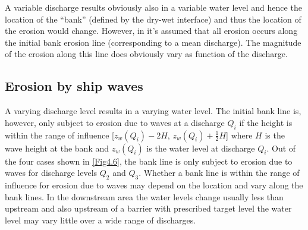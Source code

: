 A variable discharge results obviously also in a variable water level and hence the location of the ``bank'' (defined by the dry-wet interface) and thus the location of the erosion would change.
However, in \dfastbe it's assumed that all erosion occurs along the initial bank erosion line (corresponding to a mean discharge).
The magnitude of the erosion along this line does obviously vary as function of the discharge.

\subsection{Erosion by ship waves}

A varying discharge level results in a varying water level.
The initial bank line is, however, only subject to erosion due to waves at a discharge $Q_i$ if the height is within the range of influence [$z_w(Q_i) - 2 H$, $z_w(Q_i) + \frac{1}{2} H$] where $H$ is the wave height at the bank and $z_w(Q_i)$ is the water level at discharge $Q_i$.
Out of the four cases shown in \autoref{Fig4.6}, the bank line is only subject to erosion due to waves for discharge levels $Q_2$ and $Q_3$.
Whether a bank line is within the range of influence for erosion due to waves may depend on the location and vary along the bank lines.
In the downstream area the water levels change usually less than upstream and also upstream of a barrier with prescribed target level the water level may vary little over a wide range of discharges.

